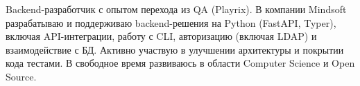 \hspace{0.2in}Backend-разработчик с опытом перехода из QA (Playrix).
В компании Mindsoft разрабатываю и поддерживаю backend-решения на Python (FastAPI, Typer),
включая API-интеграции, работу с CLI, авторизацию (включая LDAP) и взаимодействие с БД.
Активно участвую в улучшении архитектуры и покрытии кода тестами.
В свободное время развиваюсь в области Computer Science и Open Source.
